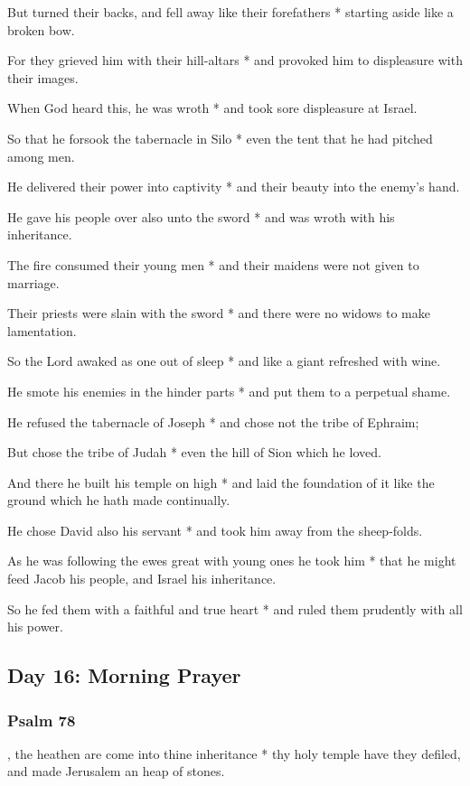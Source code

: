 But turned their backs, and fell away like their forefathers * starting aside like a broken bow.

For they grieved him with their hill-altars * and provoked him to displeasure with their images.

When God heard this, he was wroth * and took sore displeasure at Israel.

So that he forsook the tabernacle in Silo * even the tent that he had pitched among men.

He delivered their power into captivity * and their beauty into the enemy's hand.

He gave his people over also unto the sword * and was wroth with his inheritance.

The fire consumed their young men * and their maidens were not given to marriage.

Their priests were slain with the sword * and there were no widows to make lamentation.

So the Lord awaked as one out of sleep * and like a giant refreshed with wine.

He smote his enemies in the hinder parts * and put them to a perpetual shame.

He refused the tabernacle of Joseph * and chose not the tribe of Ephraim;

But chose the tribe of Judah * even the hill of Sion which he loved.

And there he built his temple on high * and laid the foundation of it like the ground which he hath made continually.

He chose David also his servant * and took him away from the sheep-folds.

As he was following the ewes great with young ones he took him * that he might feed Jacob his people, and Israel his inheritance.

So he fed them with a faithful and true heart * and ruled them prudently with all his power.

\subsection{Day 16: Morning Prayer}

\subsubsection{Psalm 78}


, the heathen are come into thine inheritance * thy holy temple have they defiled, and made Jerusalem an heap of stones.


